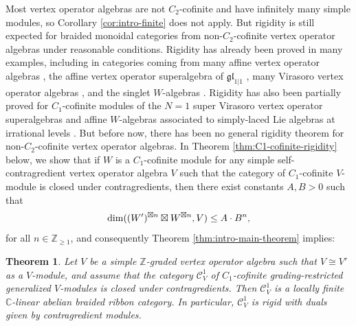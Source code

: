 \documentclass[11pt, reqno]{amsart}
\newtheorem{thm}{Theorem}[section]
\theoremstyle{definition}\newtheorem{defi}[thm]{Definition}
\theoremstyle{definition}\newtheorem{rem}[thm]{Remark}
\theoremstyle{definition}\newtheorem{exam}[thm]{Example}
\theoremstyle{definition}\newtheorem{assum}[thm]{Assumption}
\newcommand{\cC}{\mathcal{C}}
\newcommand{\CC}{\mathbb{C}}
\newcommand{\ZZ}{\mathbb{Z}}
\let\hom\relax
\DeclareMathOperator{\hom}{Hom}
\begin{document}
Most vertex operator algebras are not $C_2$-cofinite and have infinitely many simple modules, so Corollary \ref{cor:intro-finite} does not apply. But rigidity is still expected for braided monoidal categories from non-$C_2$-cofinite vertex operator algebras under reasonable conditions. Rigidity has already been proved in many examples, including in categories coming from many affine vertex operator algebras \cite{KL4, CY, MY, CMY6, NORW}, the affine vertex operator superalgebra of $\mathfrak{gl}_{1\vert 1}$ \cite{CMY3}, many Virasoro vertex operator algebras \cite{CJORY, MY1, MY2}, and the singlet $W$-algebras \cite{CMY2,CMY4}. Rigidity has also been partially proved for $C_1$-cofinite modules of the $N=1$ super Virasoro vertex operator superalgebras \cite{CMY1,CMOY} and affine $W$-algebras associated to simply-laced Lie algebras at irrational levels \cite{CDN}. But before now, there has been no general rigidity theorem for non-$C_2$-cofinite vertex operator algebras. In Theorem \ref{thm:C1-cofinite-rigidity} below, we show that if $W$ is a $C_1$-cofinite module for any simple self-contragredient vertex operator algebra $V$ such that the category of $C_1$-cofinite $V$-module is closed under contragredients, then there exist constants $A,B>0$ such that
\begin{equation*}
\dim\hom((W')^{\boxtimes n}\boxtimes W^{\boxtimes n}, V)\leq A\cdot B^n,
\end{equation*}
for all $n\in\ZZ_{\geq 1}$, and consequently Theorem \ref{thm:intro-main-theorem} implies:
\begin{thm}
Let $V$ be a simple $\ZZ$-graded vertex operator algebra such that $V\cong V'$ as a $V$-module, and assume that the category $\cC_V^1$ of $C_1$-cofinite grading-restricted generalized $V$-modules is closed under contragredients. Then $\cC_V^1$ is a locally finite $\CC$-linear abelian braided ribbon category. In particular, $\cC_V^1$ is rigid with duals given by contragredient modules.
\end{thm}
\end{document}
